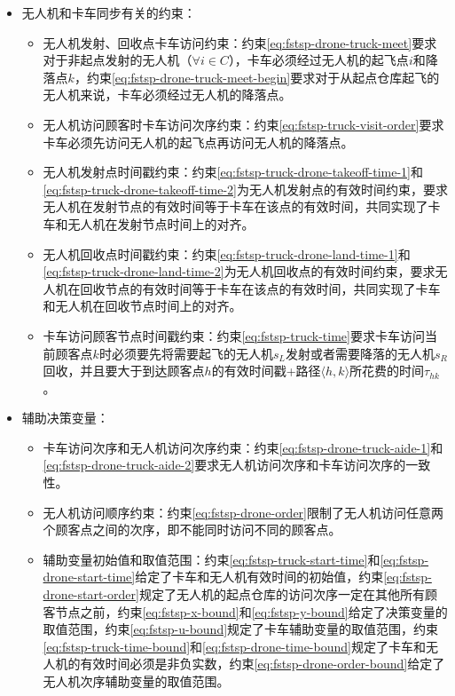 \begin{itemize}
\begin{itemize}
    \end{itemize}
    \item \colorbox{shallow-yellow}{无人机和卡车同步有关的约束：}
    \begin{itemize}
        \item 无人机发射、回收点卡车访问约束：约束\ref{eq:fstsp-drone-truck-meet}要求对于非起点发射的无人机（$\forall i \in C$），卡车必须经过无人机的起飞点$i$和降落点$k$，约束\ref{eq:fstsp-drone-truck-meet-begin}要求对于从起点仓库起飞的无人机来说，卡车必须经过无人机的降落点。
        \item 无人机访问顾客时卡车访问次序约束：约束\ref{eq:fstsp-truck-visit-order}要求卡车必须先访问无人机的起飞点再访问无人机的降落点。
        \item 无人机发射点时间戳约束：约束\ref{eq:fstsp-truck-drone-takeoff-time-1}和\ref{eq:fstsp-truck-drone-takeoff-time-2}为无人机发射点的有效时间约束，要求无人机在发射节点的有效时间等于卡车在该点的有效时间，共同实现了卡车和无人机在发射节点时间上的对齐。
        \item 无人机回收点时间戳约束：约束\ref{eq:fstsp-truck-drone-land-time-1}和\ref{eq:fstsp-truck-drone-land-time-2}为无人机回收点的有效时间约束，要求无人机在回收节点的有效时间等于卡车在该点的有效时间，共同实现了卡车和无人机在回收节点时间上的对齐。
        \item 卡车访问顾客节点时间戳约束：约束\ref{eq:fstsp-truck-time}要求卡车访问当前顾客点$k$时必须要先将需要起飞的无人机$s_L$发射或者需要降落的无人机$s_R$回收，并且要大于到达顾客点$h$的有效时间戳+路径$\langle h,k \rangle$所花费的时间$\tau_{hk}$。
    \end{itemize}
    \item 辅助决策变量：
    \begin{itemize}
        \item 卡车访问次序和无人机访问次序约束：约束\ref{eq:fstsp-drone-truck-aide-1}和\ref{eq:fstsp-drone-truck-aide-2}要求无人机访问次序和卡车访问次序的一致性。
        \item 无人机访问顺序约束：约束\ref{eq:fstsp-drone-order}限制了无人机访问任意两个顾客点之间的次序，即不能同时访问不同的顾客点。
        \item 辅助变量初始值和取值范围：约束\ref{eq:fstsp-truck-start-time}和\ref{eq:fstsp-drone-start-time}给定了卡车和无人机有效时间的初始值，约束\ref{eq:fstsp-drone-start-order}规定了无人机的起点仓库的访问次序一定在其他所有顾客节点之前，约束\ref{eq:fstsp-x-bound}和\ref{eq:fstsp-y-bound}给定了决策变量的取值范围，约束\ref{eq:fstsp-u-bound}规定了卡车辅助变量的取值范围，约束\ref{eq:fstsp-truck-time-bound}和\ref{eq:fstsp-drone-time-bound}规定了卡车和无人机的有效时间必须是非负实数，约束\ref{eq:fstsp-drone-order-bound}给定了无人机次序辅助变量的取值范围。
    \end{itemize}
\end{itemize}


